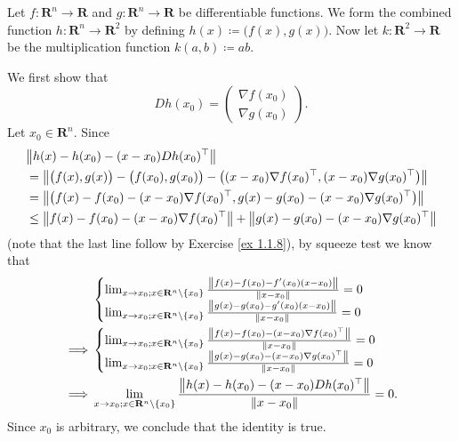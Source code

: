 \begin{example}\label{6.4.2}
    Let \(f : \mathbf{R}^n \to \mathbf{R}\) and \(g : \mathbf{R}^n \to \mathbf{R}\) be differentiable functions.
    We form the combined function \(h : \mathbf{R}^n \to \mathbf{R}^2\) by defining \(h(x) \coloneqq \big(f(x), g(x)\big)\).
    Now let \(k : \mathbf{R}^2 \to \mathbf{R}\) be the multiplication function \(k(a, b) \coloneqq ab\).

    We first show that
    \[
        D h(x_0) = \begin{pmatrix}
            \nabla f(x_0) \\
            \nabla g(x_0)
        \end{pmatrix}.
    \]
    Let \(x_0 \in \mathbf{R}^n\).
    Since
    \begin{align*}
         & \norm*{h(x) - h(x_0) - (x - x_0) D h(x_0)^\top}                                                                                  \\
         & = \norm*{\big(f(x), g(x)\big) - \big(f(x_0), g(x_0)\big) - \big((x - x_0) \nabla f(x_0)^\top, (x - x_0) \nabla g(x_0)^\top\big)} \\
         & = \norm*{\big(f(x) - f(x_0) - (x - x_0) \nabla f(x_0)^\top, g(x) - g(x_0) - (x - x_0) \nabla g(x_0)^\top\big)}                   \\
         & \leq \norm*{f(x) - f(x_0) - (x - x_0) \nabla f(x_0)^\top} + \norm*{g(x) - g(x_0) - (x - x_0) \nabla g(x_0)^\top}
    \end{align*}
    (note that the last line follow by Exercise \ref{ex 1.1.8}),
    by squeeze test we know that
    \begin{align*}
                 & \begin{cases}
            \lim_{x \to x_0 ; x \in \mathbf{R}^n \setminus \{x_0\}} \frac{\norm*{f(x) - f(x_0) - f'(x_0)(x - x_0)}}{\norm*{x - x_0}} = 0 \\
            \lim_{x \to x_0 ; x \in \mathbf{R}^n \setminus \{x_0\}} \frac{\norm*{g(x) - g(x_0) - g'(x_0)(x - x_0)}}{\norm*{x - x_0}} = 0
        \end{cases}                                                                                                           \\
        \implies & \begin{cases}
            \lim_{x \to x_0 ; x \in \mathbf{R}^n \setminus \{x_0\}} \frac{\norm*{f(x) - f(x_0) - (x - x_0) \nabla f(x_0)^\top}}{\norm*{x - x_0}} = 0 \\
            \lim_{x \to x_0 ; x \in \mathbf{R}^n \setminus \{x_0\}} \frac{\norm*{g(x) - g(x_0) - (x - x_0) \nabla g(x_0)^\top}}{\norm*{x - x_0}} = 0
        \end{cases}                                                                                                           \\
        \implies & \lim_{x \to x_0 ; x \in \mathbf{R}^n \setminus \{x_0\}} \frac{\norm*{h(x) - h(x_0) - (x - x_0) D h(x_0)^\top}}{\norm*{x - x_0}} = 0.
    \end{align*}
    Since \(x_0\) is arbitrary, we conclude that the identity is true.


\end{example}
